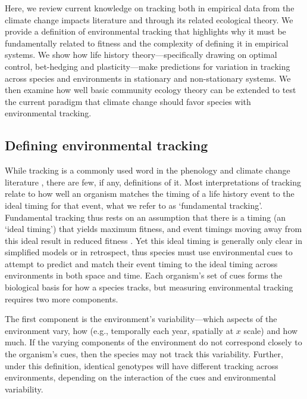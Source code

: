 \documentclass[11pt,letterpaper]{article}
\begin{document}
Here, we review current knowledge on tracking both in empirical data from the climate change impacts literature and through its related ecological theory. We provide a definition of environmental tracking that highlights why it must be fundamentally related to fitness and the complexity of defining it in empirical systems. We show how life history theory---specifically drawing on optimal control, bet-hedging and plasticity---make predictions for variation in tracking across species and environments in stationary and non-stationary systems. We then examine how well basic community ecology theory can be extended to test the current paradigm that climate change should favor species with environmental tracking. 

\subsection{Defining environmental tracking}
While tracking is a commonly used word in the phenology and climate change literature \citep[e.g.,][]{Menzel:2006xn,Cleland:2012,deacy2018}, there are few, if any, definitions of it. Most interpretations of tracking relate to how well an organism matches the timing of a life history event to the ideal timing for that event, what we refer to as `fundamental tracking'. Fundamental tracking thus rests on an assumption that there is a timing (an `ideal timing') that yields maximum fitness, and event timings moving away from this ideal result in reduced fitness \citep[a foundational concept of the trophic mismatch literature,][]{vissergienapp2019}. Yet this ideal timing is generally only clear in simplified models or in retrospect, thus species must use environmental cues to attempt to predict and match their event timing to the ideal timing across environments in both space and time. Each organism's set of cues forms the biological basis for how a species tracks, but measuring environmental tracking requires two more components.

The first component is the environment's variability---which aspects of the environment vary, how (e.g., temporally each year, spatially at $x$ scale) and how much. If the varying components of the environment do not correspond closely to the organism's cues, then the species may not track this variability. Further, under this definition, identical genotypes will have different tracking across environments, depending on the interaction of the cues and environmental variability.
\end{document}
